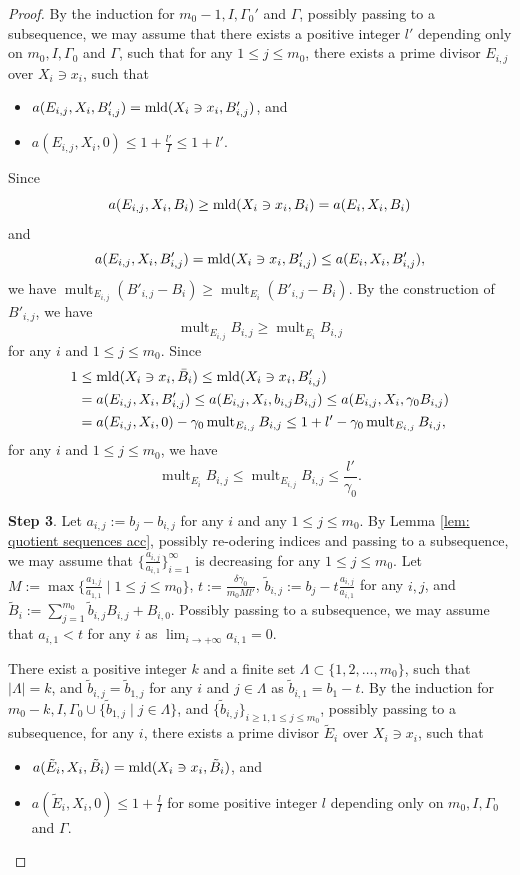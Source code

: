 \documentclass[11pt]{amsart}
\numberwithin{equation}{section}
\newcommand{\mld}{{\rm{mld}}}
\newcommand{\mult}{\operatorname{mult}}
\newcommand{\Ii}{{\Gamma}}
\theoremstyle{definition}
\theoremstyle{definition}
\begin{document}
\begin{proof}
By the induction for $m_0-1,I,\Ii_0'$ and $\Ii$, possibly passing to a subsequence, we may assume that there exists a positive integer $l'$ depending only on $m_0,I,\Ii_0$ and $\Ii$, such that for any $1\leq j\leq m_0$, there exists a prime divisor $E_{i,j}$ over $X_i\ni x_i$, such that
\begin{itemize}
    \item $a(E_{i,j},X_i,B'_{i,j})=\mld(X_i\ni x_i,B_{i,j}')$, and
    \item $a(E_{i,j},X_i,0)\leq 1+\frac{l'}{I}\le 1+l'$.
\end{itemize}
Since
$$a(E_{i,j},X_i,B_i)\geq\mld(X_i\ni x_i,B_i)=a(E_i,X_i,B_i)$$
and
$$a(E_{i,j},X_i,B'_{i,j})=\mld(X_i\ni x_i,B'_{i,j})\leq a(E_i,X_i,B'_{i,j}),$$
we have $\mult_{E_{i,j}}(B'_{i,j}-B_i)\geq\mult_{E_{i}}(B'_{i,j}-B_i)$. By the construction of $B'_{i,j}$, we have
$$\mult_{E_{i,j}}B_{i,j}\geq\mult_{E_i}B_{i,j}$$
for any $i$ and $1\leq j\leq m_0$.
Since 
\begin{align*}
    1&\leq \mld(X_i\ni x_i,\bar B_i)\leq\mld(X_i\ni x_i,B'_{i,j})\\
    &=a(E_{i,j},X_i,B'_{i,j})\leq a(E_{i,j},X_i,b_{i,j}B_{i,j})\leq a(E_{i,j},X_i,\gamma_0B_{i,j})\\
    &=a(E_{i,j},X_i,0)-\gamma_0\mult_{E_{i,j}}B_{i,j}\leq 1+l'-\gamma_0\mult_{E_{i,j}}B_{i,j},
\end{align*}
for any $i$ and $1\leq j\leq m_0$, we have 
$$\mult_{E_i}B_{i,j}\leq\mult_{E_{i,j}}B_{i,j}\leq\frac{l'}{\gamma_0}.$$

\medskip

\noindent\textbf{Step 3}. Let $a_{i,j}:=b_j-b_{i,j}$ for any $i$ and any $1\leq j\leq m_0$. By Lemma \ref{lem: quotient sequences acc}, possibly re-odering indices and passing to a subsequence, we may assume that $\{\frac{a_{i,j}}{a_{i,1}}\}_{i=1}^{\infty}$ is decreasing for any $1\leq j\leq m_0$. Let $M:=\max\{\frac{a_{1,j}}{a_{1,1}}\mid 1\leq j\leq m_0\}$, $t:=\frac{\delta\gamma_0}{m_0Ml'}$, $\tilde b_{i,j}:=b_j-t\frac{a_{i,j}}{a_{i,1}}$ for any $i,j$, and $\tilde B_{i}:=\sum_{j=1}^{m_0}\tilde b_{i,j}B_{i,j}+B_{i,0}$. Possibly passing to a subsequence, we may assume that $a_{i,1}<t$ for any $i$ as $\lim_{i\to+\infty}a_{i,1}=0$.  

There exist a positive integer $k$ and a finite set $\Lambda\subset\{1,2,\dots,m_0\}$, such that $|\Lambda|=k$, and $\tilde b_{i,j}=\tilde b_{1,j}$ for any $i$ and $j\in\Lambda$ as $\tilde b_{i,1}=b_1-t$. By the induction for $m_0-k,I,\Ii_0\cup\{\tilde b_{1,j}\mid j\in\Lambda\}$, and $\{\tilde b_{i,j}\}_{i\geq 1,1\leq j\leq m_0}$, possibly passing to a subsequence, for any $i$, there exists a prime divisor $\tilde E_i$ over $X_i\ni x_i$, such that
\begin{itemize}
    \item $a(\tilde E_i,X_i,\tilde B_i)=\mld(X_i\ni x_i,\tilde B_i)$, and
    \item $a(\tilde E_i,X_i,0)\leq 1+\frac{l}{I}$ for some positive integer $l$ depending only on $m_0,I,\Ii_0$ and $\Ii$.
\end{itemize}


\end{proof}
\end{document}
